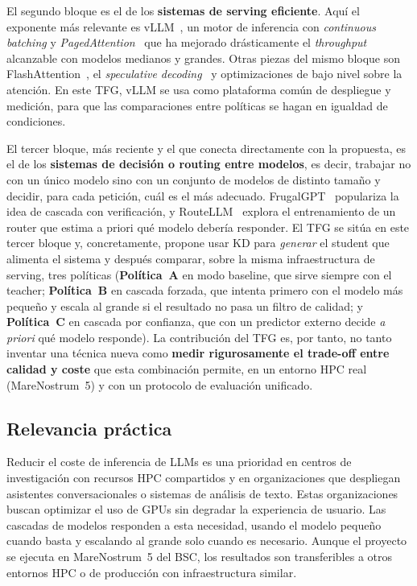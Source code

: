 \documentclass[11pt,a4paper]{article}
\begin{document}
El segundo bloque es el de los \textbf{sistemas de serving eficiente}. Aquí el exponente más relevante es vLLM~\cite{vllm-docs}, un motor de inferencia con \emph{continuous batching} y \emph{PagedAttention}~\cite{vllm2023} que ha mejorado drásticamente el \textit{throughput} alcanzable con modelos medianos y grandes. Otras piezas del mismo bloque son FlashAttention~\cite{dao2022flashattention}, el \textit{speculative decoding}~\cite{leviathan2023speculative} y optimizaciones de bajo nivel sobre la atención. En este TFG, vLLM se usa como plataforma común de despliegue y medición, para que las comparaciones entre políticas se hagan en igualdad de condiciones.

El tercer bloque, más reciente y el que conecta directamente con la propuesta, es el de los \textbf{sistemas de decisión o routing entre modelos}, es decir, trabajar no con un único modelo sino con un conjunto de modelos de distinto tamaño y decidir, para cada petición, cuál es el más adecuado. FrugalGPT~\cite{chen2023frugalgpt} populariza la idea de cascada con verificación, y RouteLLM~\cite{dekoninck2024routing} explora el entrenamiento de un router que estima a priori qué modelo debería responder. El TFG se sitúa en este tercer bloque y, concretamente, propone usar KD para \emph{generar} el student que alimenta el sistema y después comparar, sobre la misma infraestructura de serving, tres políticas (\textbf{Política~A} en modo baseline, que sirve siempre con el teacher; \textbf{Política~B} en cascada forzada, que intenta primero con el modelo más pequeño y escala al grande si el resultado no pasa un filtro de calidad; y \textbf{Política~C} en cascada por confianza, que con un predictor externo decide \textit{a priori} qué modelo responde). La contribución del TFG es, por tanto, no tanto inventar una técnica nueva como \textbf{medir rigurosamente el trade-off entre calidad y coste} que esta combinación permite, en un entorno HPC real (MareNostrum~5) y con un protocolo de evaluación unificado.

\subsection{Relevancia práctica}

Reducir el coste de inferencia de LLMs es una prioridad en centros de investigación con recursos HPC compartidos y en organizaciones que despliegan asistentes conversacionales o sistemas de análisis de texto. Estas organizaciones buscan optimizar el uso de GPUs sin degradar la experiencia de usuario. Las cascadas de modelos responden a esta necesidad, usando el modelo pequeño cuando basta y escalando al grande solo cuando es necesario. Aunque el proyecto se ejecuta en MareNostrum~5 del BSC, los resultados son transferibles a otros entornos HPC o de producción con infraestructura similar.
\end{document}
